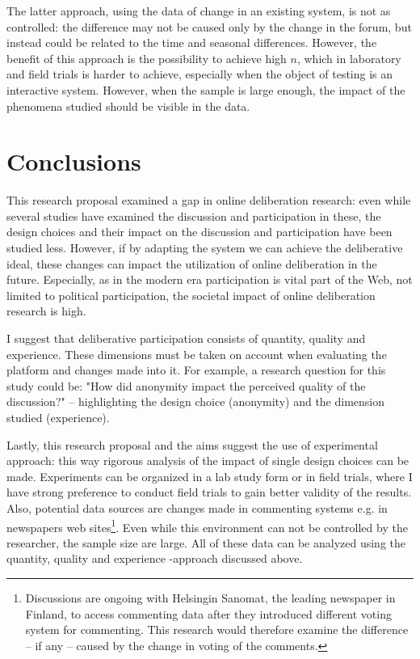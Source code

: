 \documentclass{article}
\begin{document}
The latter approach, using the data of change in an existing system, is not as controlled: the difference may not be caused only by the change in the forum, but instead could be related to the time and seasonal differences. However, the benefit of this approach is the possibility to achieve high $n$, which in laboratory and field trials is harder to achieve, especially when the object of testing is an interactive system. However, when the sample is large enough, the impact of the phenomena studied should be visible in the data.

\section{Conclusions}

This research proposal examined a gap in online deliberation research: even while several studies have examined the discussion and participation in these, the design choices and their impact on the discussion and participation have been studied less. However, if by adapting the system we can achieve the deliberative ideal, these changes can impact the utilization of online deliberation in the future. Especially, as in the modern era participation is vital part of the Web, not limited to political participation, the societal impact of online deliberation research is high.

I suggest that deliberative participation consists of quantity, quality and experience. These dimensions must be taken on account when evaluating the platform and changes made into it. For example, a research question for this study could be: "How did anonymity impact the perceived quality of the discussion?" -- highlighting the design choice (anonymity) and the dimension studied (experience).

Lastly, this research proposal and the aims suggest the use of experimental approach: this way rigorous analysis of the impact of single design choices can be made. Experiments can be organized in a lab study form or in field trials, where I have strong preference to conduct field trials to gain better validity of the results. Also, potential data sources are changes made in commenting systems e.g. in newspapers web sites\footnote{Discussions are ongoing with Helsingin Sanomat, the leading newspaper in Finland, to access commenting data after they introduced different voting system for commenting. This research would therefore examine the difference -- if any -- caused by the change in voting of the comments.}. Even while this environment can not be controlled by the researcher, the sample size are large. All of these data can be analyzed using the quantity, quality and experience -approach discussed above.

\newpage


\begin{small}

\end{small}
\end{document}

